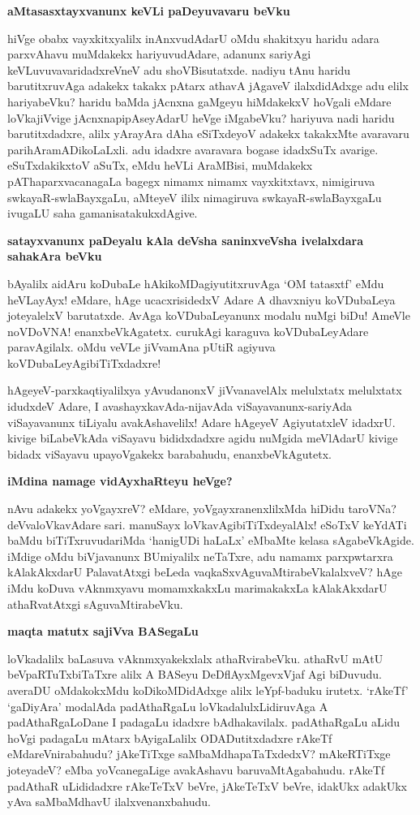 \textbf{aMtasasxtayxvanunx keVLi paDeyuvavaru beVku}

hiVge obabx vayxkitxyalilx inAnxvudAdarU oMdu shakitxyu haridu adara 
parxvAhavu muMdakekx hariyuvudAdare, adanunx sariyAgi keVLuvuvavaridadxreVneV adu shoVBisutatxde. nadiyu tAnu haridu barutitxruvAga adakekx takakx pAtarx athavA jAgaveV ilalxdidAdxge adu elilx hariyabeVku? haridu baMda jAcnxna gaMgeyu hiMdakekxV hoVgali eMdare loVkajiVvige jAcnxnapipAseyAdarU heVge iMgabeVku? hariyuva nadi haridu barutitxdadxre, alilx yArayAra dAha eSiTxdeyoV adakekx takakxMte avaravaru parihAramADikoLaLxli. adu idadxre avaravara bogase idadxSuTx avarige. eSuTxdakikxtoV aSuTx, eMdu heVLi AraMBisi, muMdakekx pAThaparxvacanagaLa bagegx nimamx nimamx vayxkitxtavx, nimigiruva swkayaR-swlaBayxgaLu, aMteyeV ililx nimagiruva swkayaR-swlaBayxgaLu ivugaLU saha gamanisatakukxdAgive.

\textbf{satayxvanunx paDeyalu kAla deVsha saninxveVsha ivelalxdara sahakAra beVku}

bAyalilx aidAru koDubaLe hAkikoMDagiyutitxruvAga `OM tatasxtf' eMdu heVLayAyx! eMdare, hAge ucacxrisidedxV Adare A dhavxniyu koVDubaLeya joteyalelxV barutatxde. AvAga koVDubaLeyanunx modalu nuMgi biDu! AmeVle noVDoVNA! enanxbeVkAgatetx. curukAgi karaguva koVDubaLeyAdare paravAgilalx. oMdu veVLe jiVvamAna pUtiR agiyuva koVDubaLeyAgibiTiTxdadxre!

hAgeyeV-parxkaqtiyalilxya yAvudanonxV jiVvanavelAlx melulxtatx 
melulxtatx idudxdeV Adare, I avashayxkavAda-nijavAda 
viSayavanunx-sariyAda viSayavanunx tiLiyalu avakAshavelilx! Adare 
hAgeyeV AgiyutatxleV idadxrU. kivige biLabeVkAda viSayavu bididxdadxre 
agidu nuMgida meVlAdarU kivige bidadx viSayavu upayoVgakekx barabahudu, enanxbeVkAgutetx.

\textbf{iMdina namage vidAyxhaRteyu heVge?}

nAvu adakekx yoVgayxreV? eMdare, yoVgayxranenxlilxMda hiDidu taroVNa? 
deVvaloVkavAdare sari. manuSayx loVkavAgibiTiTxdeyalAlx! eSoTxV keYdATi baMdu biTiTxruvudariMda `hanigUDi haLaLx' eMbaMte kelasa sAgabeVkAgide. iMdige oMdu biVjavanunx BUmiyalilx neTaTxre, adu namamx parxpwtarxra kAlakAkxdarU PalavatAtxgi beLeda vaqkaSxvAguvaMtirabeVkalalxveV? hAge iMdu koDuva vAknmxyavu momamxkakxLu marimakakxLa kAlakAkxdarU athaRvatAtxgi sAguvaMtirabeVku.

\textbf{maqta matutx sajiVva BASegaLu}

loVkadalilx baLasuva vAknmxyakekxlalx athaRvirabeVku. athaRvU mAtU 
beVpaRTuTxbiTaTxre alilx A BASeyu DeDflAyxMgevxVjaf Agi biDuvudu. 
averaDU oMdakokxMdu koDikoMDidAdxge alilx leYpf-baduku irutetx. `rAkeTf' `gaDiyAra' modalAda padAthaRgaLu loVkadalulxLidiruvAga A padAthaRgaLoDane I padagaLu idadxre bAdhakavilalx. padAthaRgaLu aLidu hoVgi padagaLu mAtarx bAyigaLalilx ODADutitxdadxre rAkeTf eMdareVnirabahudu? jAkeTiTxge saMbaMdhapaTaTxdedxV? mAkeRTiTxge joteyadeV? eMba yoVcanegaLige avakAshavu baruvaMtAgabahudu. rAkeTf padAthaR uLididadxre rAkeTeTxV beVre, jAkeTeTxV beVre, idakUkx adakUkx yAva saMbaMdhavU ilalxvenanxbahudu.

